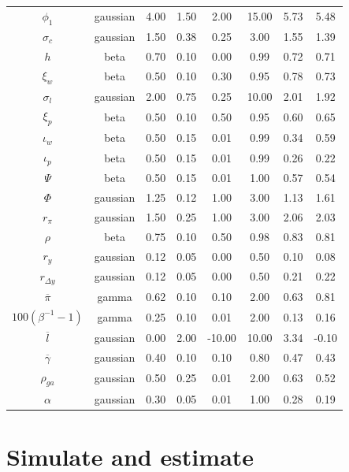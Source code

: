\documentclass[11pt]{article}
\begin{document}
\begin{table}
\begin{tabular}[t]{cccccccc}
$\phi_1$ & gaussian & 4.00 & 1.50 & 2.00 & 15.00 & 5.73 & 5.48\\
$\sigma_c$ & gaussian & 1.50 & 0.38 & 0.25 & 3.00 & 1.55 & 1.39\\
$h$ & beta & 0.70 & 0.10 & 0.00 & 0.99 & 0.72 & 0.71\\
$\xi_w$ & beta & 0.50 & 0.10 & 0.30 & 0.95 & 0.78 & 0.73\\
\addlinespace
$\sigma_l$ & gaussian & 2.00 & 0.75 & 0.25 & 10.00 & 2.01 & 1.92\\
$\xi_p$ & beta & 0.50 & 0.10 & 0.50 & 0.95 & 0.60 & 0.65\\
$\iota_w$ & beta & 0.50 & 0.15 & 0.01 & 0.99 & 0.34 & 0.59\\
$\iota_p$ & beta & 0.50 & 0.15 & 0.01 & 0.99 & 0.26 & 0.22\\
$\Psi$ & beta & 0.50 & 0.15 & 0.01 & 1.00 & 0.57 & 0.54\\
\addlinespace
$\Phi$ & gaussian & 1.25 & 0.12 & 1.00 & 3.00 & 1.13 & 1.61\\
$r_\pi$ & gaussian & 1.50 & 0.25 & 1.00 & 3.00 & 2.06 & 2.03\\
$\rho$ & beta & 0.75 & 0.10 & 0.50 & 0.98 & 0.83 & 0.81\\
$r_y$ & gaussian & 0.12 & 0.05 & 0.00 & 0.50 & 0.10 & 0.08\\
$r_{\Delta y}$ & gaussian & 0.12 & 0.05 & 0.00 & 0.50 & 0.21 & 0.22\\
\addlinespace
$\overline{\pi}$ & gamma & 0.62 & 0.10 & 0.10 & 2.00 & 0.63 & 0.81\\
$100(\beta^{-1} -1)$ & gamma & 0.25 & 0.10 & 0.01 & 2.00 & 0.13 & 0.16\\
$\overline{l}$ & gaussian & 0.00 & 2.00 & -10.00 & 10.00 & 3.34 & -0.10\\
$\overline{\gamma}$ & gaussian & 0.40 & 0.10 & 0.10 & 0.80 & 0.47 & 0.43\\
$\rho_{ga}$ & gaussian & 0.50 & 0.25 & 0.01 & 2.00 & 0.63 & 0.52\\
\addlinespace
$\alpha$ & gaussian & 0.30 & 0.05 & 0.01 & 1.00 & 0.28 & 0.19\\
\bottomrule
\end{tabular}
\end{table}

\hypertarget{sec:simulate-estimate}{%
\section{Simulate and estimate}\label{sec:simulate-estimate}}
\end{document}

